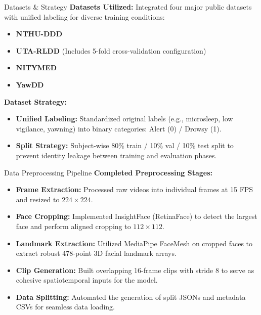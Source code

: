 \documentclass{beamer}
\begin{document}
\begin{frame}{Datasets \& Strategy}
    \textbf{Datasets Utilized:} Integrated four major public datasets with unified labeling for diverse training conditions:
    \begin{itemize}
        \item \textbf{NTHU-DDD}
        \item \textbf{UTA-RLDD} (Includes 5-fold cross-validation configuration)
        \item \textbf{NITYMED}
        \item \textbf{YawDD}
    \end{itemize}
    \vspace{0.3cm}
    
    \textbf{Dataset Strategy:}
    \begin{itemize}
        \item \textbf{Unified Labeling:} Standardized original labels (e.g., microsleep, low vigilance, yawning) into binary categories: Alert (0) / Drowsy (1).
        \item \textbf{Split Strategy:} Subject-wise 80\% train / 10\% val / 10\% test split to prevent identity leakage between training and evaluation phases.
    \end{itemize}
\end{frame}

\begin{frame}{Data Preprocessing Pipeline}
    \textbf{Completed Preprocessing Stages:}
    \begin{itemize}
        \item \textbf{Frame Extraction:} Processed raw videos into individual frames at 15 FPS and resized to $224 \times 224$.
        \item \textbf{Face Cropping:} Implemented InsightFace (RetinaFace) to detect the largest face and perform aligned cropping to $112 \times 112$.
        \item \textbf{Landmark Extraction:} Utilized MediaPipe FaceMesh on cropped faces to extract robust 478-point 3D facial landmark arrays.
        \item \textbf{Clip Generation:} Built overlapping 16-frame clips with stride 8 to serve as cohesive spatiotemporal inputs for the model.
        \item \textbf{Data Splitting:} Automated the generation of split JSONs and metadata CSVs for seamless data loading.
    \end{itemize}
\end{frame}
\end{document}

